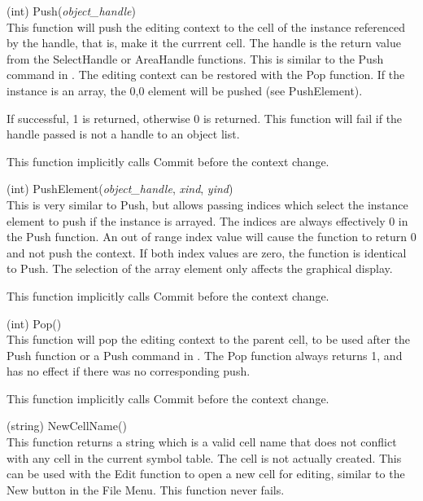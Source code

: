 \begin{description}
\item{(int) \vt Push({\it object\_handle\/})}\\
This function will push the editing context to the cell of the
instance referenced by the handle, that is, make it the currrent cell. 
The handle is the return value from the {\vt SelectHandle} or {\vt
AreaHandle} functions.  This is similar to the {\cb Push} command in
{\Xic}.  The editing context can be restored with the {\vt Pop}
function.  If the instance is an array, the 0,0 element will be pushed
(see {\vt PushElement}).

If successful, 1 is returned, otherwise 0 is returned.  This function
will fail if the handle passed is not a handle to an object list.

This function implicitly calls {\vt Commit} before the context change.

\item{(int) \vt PushElement({\it object\_handle\/}, {\it xind\/},
  {\it yind\/})}\\
This is very similar to {\vt Push}, but allows passing indices which
select the instance element to push if the instance is arrayed.  The
indices are always effectively 0 in the {\vt Push} function.  An out
of range index value will cause the function to return 0 and not push
the context.  If both index values are zero, the function is identical
to {\vt Push}.  The selection of the array element only affects the
graphical display.

This function implicitly calls {\vt Commit} before the context change.

\item{(int) \vt Pop()}\\
This function will pop the editing context to the parent cell, to be
used after the {\vt Push} function or a {\cb Push} command in {\Xic}. 
The {\vt Pop} function always returns 1, and has no effect if there
was no corresponding push.

This function implicitly calls {\vt Commit} before the context change.

\item{(string) \vt NewCellName()}\\
This function returns a string which is a valid cell name that does
not conflict with any cell in the current symbol table.  The cell is
not actually created.  This can be used with the {\vt Edit} function
to open a new cell for editing, similar to the {\cb New} button in the
{\cb File Menu}.  This function never fails.


\end{description}
